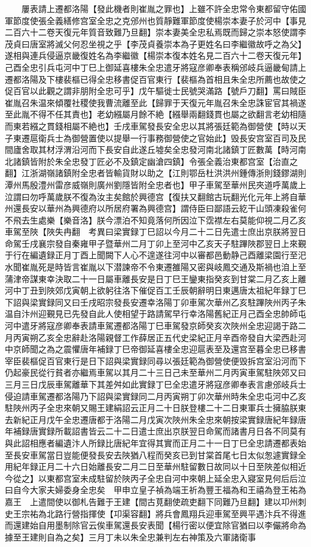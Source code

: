 　　屢表請上遷都洛陽【發此機者則崔胤之罪也】上雖不許全忠常令東都留守佑國軍節度使張全義繕修宫室全忠之克邠州也質靜難軍節度使楊崇本妻子於河中【事見二百六十二卷天復元年質音致難乃旦翻】崇本妻美全忠私焉既而歸之崇本怒使謂李茂貞曰唐室將滅父何忍坐視之乎【李茂貞養崇本為子更姓名曰李繼徽故呼之為父】遂相與連兵侵逼京畿復姓名為李繼徽【楊崇本復本姓名見二百六十二卷天復元年】己酉全忠引兵屯河中丁巳上御延喜樓朱全忠遣牙將寇彦卿奉表稱邠岐兵逼畿甸請上遷都洛陽及下樓裴樞已得全忠移書促百官東行【裴樞為首相且朱全忠所薦也故使之促百官以此觀之謂非朋附全忠可乎】戊午驅徙士民號哭滿路【號戶刀翻】罵曰賊臣崔胤召朱温來傾覆社稷使我曹流離至此【歸罪于天復元年胤召朱全忠誅宦官其禍遂至此胤不得不任其責也】老幼繦屬月餘不絶【繦舉兩翻錢貫也屬之欲翻言老幼相隨而東若繦之貫錢相屬不絶也】壬戌車駕發長安全忠以其將張廷範為御營使【時以天子東遷扈衛兵士為御營置使以提舉一行事務御營使之官始此】毁長安宫室百司及民間廬舍取其材浮渭沿河而下長安自此遂丘墟矣全忠發河南北諸鎮丁匠數萬【時河南北諸鎮皆附於朱全忠發丁匠必不及鎮定幽滄四鎮】令張全義治東都宫室【治直之翻】江浙湖嶺諸鎮附全忠者皆輸貨財以助之【江則鄂岳杜洪洪州鍾傳浙則錢鏐湖則潭州馬殷澧州雷彦威嶺則廣州劉隱皆附全忠者也】甲子車駕至華州民夾道呼萬歲上泣謂曰勿呼萬歲朕不復為汝主矣館於興德宫【復扶又翻館古玩翻光化元年上將自華州還長安以華州為興德府以所居府署為興德宫】謂侍臣曰鄙語云紇干山頭凍殺雀何不飛去生處樂【樂音洛】朕今漂泊不知竟落何所因泣下霑襟左右莫能仰視二月乙亥車駕至陜【陜失冉翻　考異曰梁實録丁巳詔以今月二十二日先遣士庶出京朕將翌日命駕壬戌襄宗發自秦雍甲子暨華州二月丁卯上至河中乙亥天子駐蹕陜郡翌日上來覲于行在編遺録正月丁酉上聞闕下人心不遑遂往河中以審都邑動静己酉離梁園行至汜水聞崔胤死是時皆言崔胤以下潜諫帝不令東遷雒陽又密與岐鳳交通及斯禍也洎上至蒲津帝謀東幸決取二十一日屬車離長安是日丁巳王鑾東指癸亥到甘棠二月乙亥上離河中丁丑到陜郊戊寅朝上欲躬往洛下催促百工壬辰朝辭明日東邁唐太祖紀年録丁巳下詔與梁實録同又曰壬戌昭宗發長安遷幸洛陽丁卯車駕次華州乙亥駐蹕陜州丙子朱温自汴州迎覲見已先發自此人使相望于路請駕早行幸洛陽舊紀正月己酉全忠帥師屯河中遣牙將寇彦卿奉表請車駕遷都洛陽丁巳車駕發京師癸亥次陜州全忠迎謁于路二月丙寅朔乙亥全忠辭赴洛陽親督工作薛居正五代史梁紀正月辛酉帝發自大梁西赴河中京師聞之為之震懼唐年補録丁巳帝御延喜樓全忠迎扈表至及還宫至暮全忠已移書宰臣裴樞促百官東行是日下詔與梁實録同尋以張廷範為御營使便毁拆宫室沿河而下仍起豪民從行貧者亦繼焉車駕以其月二十三日己未至華州二月丙寅車駕駐陜郊又曰三月三日戊辰車駕離華下其差舛如此實録丁巳全忠遣牙將寇彦卿奉表言慮邠岐兵士侵迫請車駕遷都洛陽乃下詔與梁實録同二月丙寅朔丁卯次華州時朱全忠屯河中乙亥駐陜州丙子全忠來朝又賜王建絹詔云正月二十日朕登樓二十二日東軍兵士擁脇朕東去新紀正月戊午全忠遷唐都于洛陽二月戊寅次陜州朱全忠來朝按梁實録唐紀年録唐年補録唐實録所載詔書皆云二十二日遣士庶出京朕翌日命駕而諸書月日各不同莫有與此詔相應者編遺汴人所録比唐紀年宜得其實而正月二十一日丁巳全忠請遷都表始至長安車駕當日豈能便發長安去陜猶八程而癸亥已到甘棠首尾七日太似怱遽實録全用紀年録正月二十六日始離長安二月二日至華州駐留數日故同以十日至陜差似相近今從之】以東都宫室未成駐留於陜丙子全忠自河中來朝上延全忠入寢室見何后后泣曰自今大家夫婦委身全忠矣　甲申立皇子禎為端王祈為豐王福為和王禧為登王祐為嘉王　上遣間使以御札告難于王建【間古莧翻使疏吏翻下同難乃旦翻】建以卭州刺史王宗祐為北路行營指揮使【卭渠容翻】將兵會鳳翔兵迎車駕至興平遇汴兵不得進而還建始自用墨制除官云俟車駕還長安表聞【楊行密以便宜除官猶曰以李儼將命為據至王建則自為之矣】三月丁未以朱全忠兼判左右神策及六軍諸衛事

